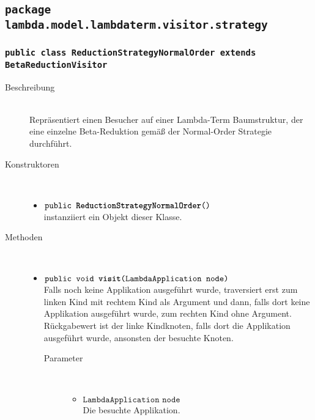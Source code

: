 \subsection{\texttt{package lambda.model.lambdaterm.visitor.strategy}}

\subsubsection{\normalfont \texttt{public class \textbf{ReductionStrategyNormalOrder} extends BetaReductionVisitor}}

\begin{description}
\item[Beschreibung] \hfill \\ Repräsentiert einen Besucher auf einer Lambda-Term Baumstruktur, der eine einzelne Beta-Reduktion gemäß der Normal-Order Strategie durchführt.

\item[Konstruktoren] \hfill \\
	\vspace{-.8cm}
	\begin{itemize}
		\item $\texttt{public \textbf{ReductionStrategyNormalOrder}()}$ \\ instanziiert ein Objekt dieser Klasse.
	\end{itemize}

\item[Methoden] \hfill \\
	\vspace{-.8cm}
	\begin{itemize}
		\item $\texttt{public void \textbf{visit}(LambdaApplication node)}$ \\ Falls noch keine Applikation ausgeführt wurde, traversiert erst zum linken Kind mit rechtem Kind als Argument und dann, falls dort keine Applikation ausgeführt wurde, zum rechten Kind ohne Argument. Rückgabewert ist der linke Kindknoten, falls dort die Applikation ausgeführt wurde, ansonsten der besuchte Knoten.
		\begin{description}
			\item[Parameter] \hfill \\
			\vspace{-.8cm}
			\begin{itemize}
				\item $\texttt{LambdaApplication node}$ \\ Die besuchte Applikation.
			\end{itemize}
		\end{description}
		

\end{itemize}
\end{description}
